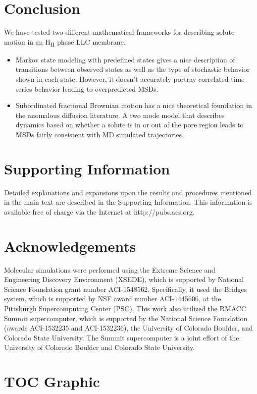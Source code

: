 \documentclass{article}
\begin{document}
  \section{Conclusion}
  
  We have tested two different mathematical frameworks for describing solute
  motion in an H\textsubscript{II} phase LLC membrane.
  \begin{itemize}
    \item Markov state modeling with predefined states gives a nice description
    of transitions between observed states as well as the type of stochastic 
    behavior shown in each state. However, it doesn't accurately portray correlated
    time series behavior leading to overpredicted MSDs.
    \item Subordinated fractional Brownian motion has a nice theoretical foundation
    in the anomalous diffusion literature. A two mode model that describes dynamics
    based on whether a solute is in or out of the pore region leads to MSDs fairly
    consistent with MD simulated trajectories.
  \end{itemize}
 
  \section*{Supporting Information}

  Detailed explanations and expansions upon the results and procedures mentioned in
  the main text are described in the Supporting Information. This information is
  available free of charge via the Internet at http://pubs.acs.org.

  \section*{Acknowledgements}

  Molecular simulations were performed using the Extreme Science and
  Engineering Discovery Environment (XSEDE), which is supported by National
  Science Foundation grant number ACI-1548562. Specifically, it used the Bridges
  system, which is supported by NSF award number ACI-1445606, at the Pittsburgh
  Supercomputing Center (PSC). This work also utilized the RMACC Summit supercomputer,
  which is supported by the National Science Foundation (awards ACI-1532235 and
  ACI-1532236), the University of Colorado Boulder, and Colorado State
  University. The Summit supercomputer is a joint effort of the University of
  Colorado Boulder and Colorado State University.

  \clearpage

  
  

  \newpage

  \section*{TOC Graphic}
\end{document}
